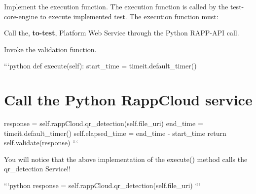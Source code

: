 Implement the execution function. The execution function is called by the test-\/core-\/engine to execute implemented test. The execution function must\-:


\begin{DoxyItemize}
\item Call the, {\bfseries to-\/test}, Platform Web Service through the Python R\-A\-P\-P-\/\-A\-P\-I call.
\item Invoke the validation function.
\end{DoxyItemize}

```python def execute(self)\-: start\-\_\-time = timeit.\-default\-\_\-timer() \section*{Call the Python Rapp\-Cloud service}

response = self.\-rapp\-Cloud.\-qr\-\_\-detection(self.\-file\-\_\-uri) end\-\_\-time = timeit.\-default\-\_\-timer() self.\-elapsed\-\_\-time = end\-\_\-time -\/ start\-\_\-time return self.\-validate(response) ```

You will notice that the above implementation of the execute() method calls the qr\-\_\-detection Service!!

```python response = self.\-rapp\-Cloud.\-qr\-\_\-detection(self.\-file\-\_\-uri) ``` 